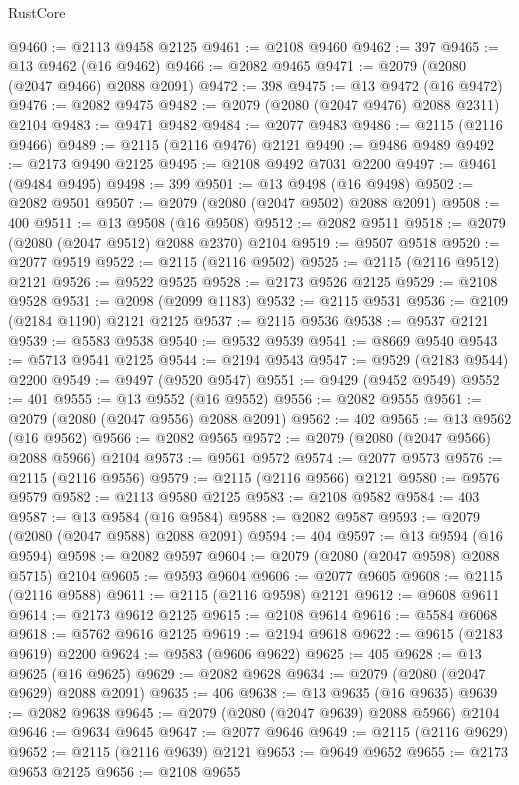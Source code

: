 \begin{lexlean}{RustCore}
\begin{coremodule}
@9460 := @2113 @9458 @2125
@9461 := @2108 @9460
@9462 := 397
@9465 := @13 @9462 (@16 @9462)
@9466 := @2082 @9465
@9471 := @2079 (@2080 (@2047 @9466) @2088 @2091)
@9472 := 398
@9475 := @13 @9472 (@16 @9472)
@9476 := @2082 @9475
@9482 := @2079 (@2080 (@2047 @9476) @2088 @2311) @2104
@9483 := @9471 @9482
@9484 := @2077 @9483
@9486 := @2115 (@2116 @9466)
@9489 := @2115 (@2116 @9476) @2121
@9490 := @9486 @9489
@9492 := @2173 @9490 @2125
@9495 := @2108 @9492 @7031 @2200
@9497 := @9461 (@9484 @9495)
@9498 := 399
@9501 := @13 @9498 (@16 @9498)
@9502 := @2082 @9501
@9507 := @2079 (@2080 (@2047 @9502) @2088 @2091)
@9508 := 400
@9511 := @13 @9508 (@16 @9508)
@9512 := @2082 @9511
@9518 := @2079 (@2080 (@2047 @9512) @2088 @2370) @2104
@9519 := @9507 @9518
@9520 := @2077 @9519
@9522 := @2115 (@2116 @9502)
@9525 := @2115 (@2116 @9512) @2121
@9526 := @9522 @9525
@9528 := @2173 @9526 @2125
@9529 := @2108 @9528
@9531 := @2098 (@2099 @1183)
@9532 := @2115 @9531
@9536 := @2109 (@2184 @1190) @2121 @2125
@9537 := @2115 @9536
@9538 := @9537 @2121
@9539 := @5583 @9538
@9540 := @9532 @9539
@9541 := @8669 @9540
@9543 := @5713 @9541 @2125
@9544 := @2194 @9543
@9547 := @9529 (@2183 @9544) @2200
@9549 := @9497 (@9520 @9547)
@9551 := @9429 (@9452 @9549)
@9552 := 401
@9555 := @13 @9552 (@16 @9552)
@9556 := @2082 @9555
@9561 := @2079 (@2080 (@2047 @9556) @2088 @2091)
@9562 := 402
@9565 := @13 @9562 (@16 @9562)
@9566 := @2082 @9565
@9572 := @2079 (@2080 (@2047 @9566) @2088 @5966) @2104
@9573 := @9561 @9572
@9574 := @2077 @9573
@9576 := @2115 (@2116 @9556)
@9579 := @2115 (@2116 @9566) @2121
@9580 := @9576 @9579
@9582 := @2113 @9580 @2125
@9583 := @2108 @9582
@9584 := 403
@9587 := @13 @9584 (@16 @9584)
@9588 := @2082 @9587
@9593 := @2079 (@2080 (@2047 @9588) @2088 @2091)
@9594 := 404
@9597 := @13 @9594 (@16 @9594)
@9598 := @2082 @9597
@9604 := @2079 (@2080 (@2047 @9598) @2088 @5715) @2104
@9605 := @9593 @9604
@9606 := @2077 @9605
@9608 := @2115 (@2116 @9588)
@9611 := @2115 (@2116 @9598) @2121
@9612 := @9608 @9611
@9614 := @2173 @9612 @2125
@9615 := @2108 @9614
@9616 := @5584 @6068
@9618 := @5762 @9616 @2125
@9619 := @2194 @9618
@9622 := @9615 (@2183 @9619) @2200
@9624 := @9583 (@9606 @9622)
@9625 := 405
@9628 := @13 @9625 (@16 @9625)
@9629 := @2082 @9628
@9634 := @2079 (@2080 (@2047 @9629) @2088 @2091)
@9635 := 406
@9638 := @13 @9635 (@16 @9635)
@9639 := @2082 @9638
@9645 := @2079 (@2080 (@2047 @9639) @2088 @5966) @2104
@9646 := @9634 @9645
@9647 := @2077 @9646
@9649 := @2115 (@2116 @9629)
@9652 := @2115 (@2116 @9639) @2121
@9653 := @9649 @9652
@9655 := @2173 @9653 @2125
@9656 := @2108 @9655

\end{coremodule}
\end{lexlean}
